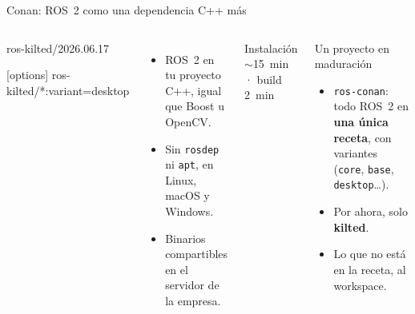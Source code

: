\documentclass[aspectratio=169]{beamer}
\begin{document}
\begin{frame}[fragile]{Conan: ROS~2 como una dependencia C++ más}
\begin{columns}[T]
\begin{filelisting}
[requires]
ros-kilted/2026.06.17

[options]
ros-kilted/*:variant=desktop
\end{filelisting}
\begin{itemize}
  \item ROS~2 en tu proyecto C++, igual que Boost u OpenCV.
  \item Sin \texttt{rosdep} ni \texttt{apt}, en Linux, macOS y Windows.
  \item Binarios compartibles en el servidor de la empresa.
\end{itemize}
{\small Instalación ${\sim}$15~min · build 2~min}
\begin{block}{Un proyecto en maduración}
\begin{itemize}
  \item \texttt{ros-conan}: todo ROS~2 en \textbf{una única receta}, con variantes (\texttt{core}, \texttt{base}, \texttt{desktop}\ldots).
  \item Por ahora, solo \textbf{kilted}.
  \item Lo que no está en la receta, al workspace.
\end{itemize}
\end{block}
\vspace{0.5em}
\end{columns}
\end{frame}

\end{document}
